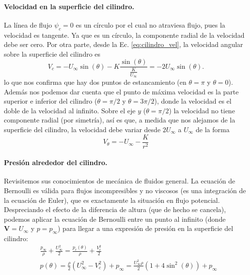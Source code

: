 \paragraph{Velocidad en la superficie del cilindro.}
La línea de flujo $\psi_c=0$ es un círculo por el cual no atraviesa flujo, pues la velocidad es tangente.
Ya que es un círculo, la componente radial de la velocidad debe ser cero.
Por otra parte, desde la Ec. \eqref{eq:cilindro_vel}, la velocidad angular sobre la superficie del cilindro es
%
\begin{equation}
V_c = -U_\infty\sin(\theta) - K\frac{\sin(\theta)}{\frac{K}{U_\infty}} = -2U_\infty\sin(\theta).
\end{equation}
%
lo que nos confirma que hay dos puntos de estancamiento (en $\theta=\pi$ y $\theta=0$).
Además nos podemos dar cuenta que el punto de máxima velocidad es la parte superior e inferior del cilindro ($\theta=\pi/2$ y $\theta=3\pi/2$), donde la velocidad es el doble de la velocidad al infinito.
Sobre el eje $y$ ($\theta=\pi/2$) la velocidad no tiene componente radial (por simetría), así es que, a medida que nos alejamos de la superficie del cilindro, la velocidad debe variar desde $2U_\infty$ a $U_\infty$ de la forma
%
\begin{equation}
V_\theta = -U_\infty - \frac{K}{r^2}
\end{equation}

\paragraph{Presión alrededor del cilindro.}

Revisitemos sus conocimientos de mecánica de fluidos general.
La ecuación de Bernoulli es válida para flujos incompresibles y no viscosos (es una integración de la ecuación de Euler), que es exactamente la situación en flujo potencial.
Despreciando el efecto de la diferencia de altura (que de hecho se cancela), podemos aplicar la ecuación de Bernoulli entre un punto al infinito (donde $\mathbf{V}=U_\infty$ y $p=p_\infty$) para llegar a una expresión de presión en la superficie del cilindro:
%
\begin{align}\label{eq:cilindro_p}
&\frac{p_\infty}{\rho} + \frac{U_\infty^2}{2} = \frac{p_c(\theta)}{\rho} + \frac{V_c^2}{2}\nonumber\\
&p(\theta) = \frac{\rho}{2}\left(U_\infty^2-V_c^2\right) + p_\infty = \frac{U_\infty^2\rho}{2}\left(1+4\sin^2(\theta)\right) + p_\infty
\end{align}

